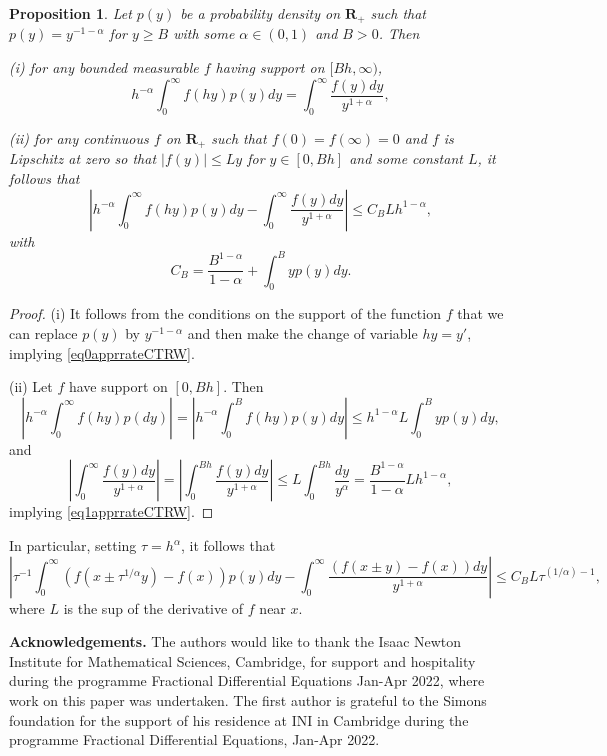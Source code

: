 \documentclass[12pt]{article}
\def\R{\mathbf{R}}
\def\al{\alpha}
\numberwithin{equation}{section}
\newtheorem{prop}{Proposition}
\begin{document}
 \begin{prop}
 \label{apprrateCTRW}
 Let $p(y)$ be a probability density on $\R_+$ such that
 $p(y)=y^{-1-\al}$ for $y\ge B$ with some $\al \in (0,1)$ and $B>0$. Then

 (i) for any bounded measurable $f$ having support on $[Bh,\infty)$,
\begin{equation}
 \label{eq0apprrateCTRW}
h^{-\al} \int_0^{\infty} f(hy) p(y) dy=\int_0^{\infty} \frac{f(y) dy}{y^{1+\al}},
\end{equation}

(ii) for any continuous $f$ on $\R_+$ such that $f(0)=f(\infty)=0$ and $f$ is Lipschitz
at zero so that $|f(y)| \le L y$ for $y\in [0,Bh]$ and some constant $L$, it follows that
 \begin{equation}
 \label{eq1apprrateCTRW}
 \left|h^{-\al} \int_0^{\infty} f(hy) p(y) dy-\int_0^{\infty} \frac{f(y) dy}{y^{1+\al}}\right| \le C_B L h^{1-\al} ,
\end{equation}
with
\[
C_B =\frac{B^{1-\al}}{1-\al} +\int_0^B y p(y)dy.
\]
 \end{prop}

\begin{proof}
(i) It follows from the conditions on the support of the function $f$ that we can replace $p(y)$ by $y^{-1-\al}$ and then make the change of variable $hy = y'$, implying \eqref{eq0apprrateCTRW}.

(ii) Let $f$ have support on $[0,Bh]$. Then
\[
\left|h^{-\al} \int_0^{\infty} f(hy) p(dy)\right|=\left|h^{-\al} \int_0^B f(hy) p(y) dy\right|
\le h^{1-\al} L \int_0^B y p(y) dy,
\]
and
\[
\left|\int_0^{\infty} \frac{f(y) dy}{y^{1+\al}}\right|=\left|\int_0^{Bh} \frac{f(y) dy}{y^{1+\al}}\right|
\le L \int_0^{Bh} \frac{dy}{y^{\al}}=\frac{B^{1-\al}}{1-\al}Lh^{1-\al},
\]
implying \eqref{eq1apprrateCTRW}.
\end{proof}

In particular, setting $\tau=h^{\al}$, it follows that
 \begin{equation}
 \label{eq10apprrateCTRW}
 \left|\tau ^{-1} \int_0^{\infty} (f(x \pm \tau^{1/\al} y)-f(x)) p(y) dy
 -\int_0^{\infty} \frac{(f(x\pm y)-f(x)) dy}{y^{1+\al}}\right| \le C_B L \tau^{(1/\al)-1},
\end{equation}
where $L$ is the sup of the derivative of $f$ near $x$.

\medskip

{\bf Acknowledgements.}
The authors would like to thank the Isaac Newton Institute for Mathematical Sciences, Cambridge, for support and hospitality during the programme Fractional Differential Equations Jan-Apr 2022, where work on this paper was undertaken.
	The first author is grateful to the Simons foundation for the support of his residence at INI in Cambridge
during the programme Fractional Differential Equations, Jan-Apr 2022.
		
\end{document}
